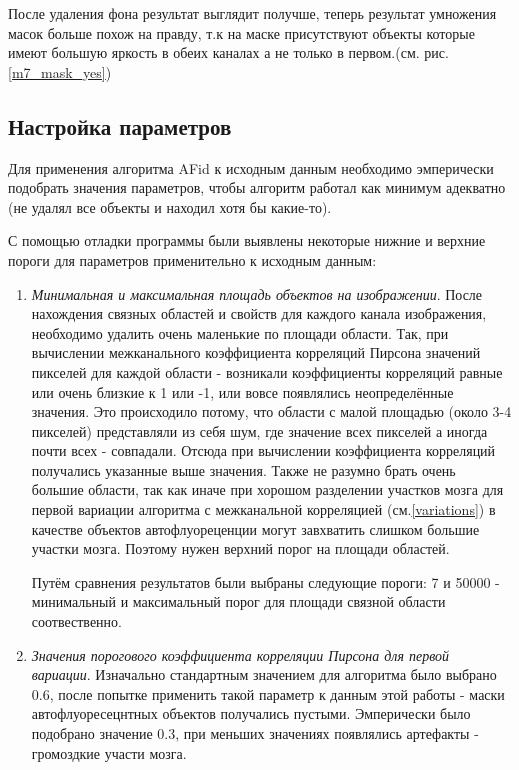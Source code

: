 После удаления фона результат выглядит получше, теперь результат умножения масок больше похож на правду, т.к на маске присутствуют объекты которые имеют большую яркость в обеих каналах а не только в первом.(см. рис. \ref{m7_mask_yes})


\subsection{Настройка параметров}
Для применения алгоритма AFid к исходным данным необходимо эмперически подобрать значения параметров, чтобы алгоритм работал как минимум адекватно (не удалял все объекты и находил хотя бы какие-то).

С помощью отладки программы были выявлены некоторые нижние и верхние пороги для параметров применительно к исходным данным:

\begin{enumerate}[1.] \label{afid_params}
	\item \textit{Минимальная и максимальная площадь объектов на изображении}. После нахождения связных областей и свойств для каждого канала изображения, необходимо удалить очень маленькие по площади области. Так, при вычислении межканального коэффициента корреляций Пирсона значений пикселей для каждой области - возникали коэффициенты корреляций равные или очень близкие к 1 или -1, или вовсе появлялись неопределённые значения. Это происходило потому, что области с малой площадью (около 3-4 пикселей) представляли из себя шум, где значение всех пикселей а иногда почти всех - совпадали. Отсюда при вычислении коэффициента корреляций получались указанные выше значения. Также не разумно брать очень большие области, так как иначе при хорошом разделении участков мозга для первой вариации алгоритма с межканальной корреляцией (см.\ref{variations}) в качестве объектов автофлуореценции могут завхватить слишком большие участки мозга. Поэтому нужен верхний порог на площади областей.
	
	Путём сравнения результатов были выбраны следующие пороги: 7 и 50000 - минимальный и максимальный порог для площади связной области соотвественно. 
	
	\item \textit{Значения порогового коэффициента корреляции Пирсона для первой вариации}.
	Изначально стандартным значением для алгоритма было выбрано 0.6, после попытке применить такой параметр к данным этой работы - маски автофлуоресецнтных объектов получались пустыми. Эмперически было подобрано значение 0.3, при меньших значениях появлялись артефакты - громоздкие участи мозга.
	
	
\end{enumerate}





